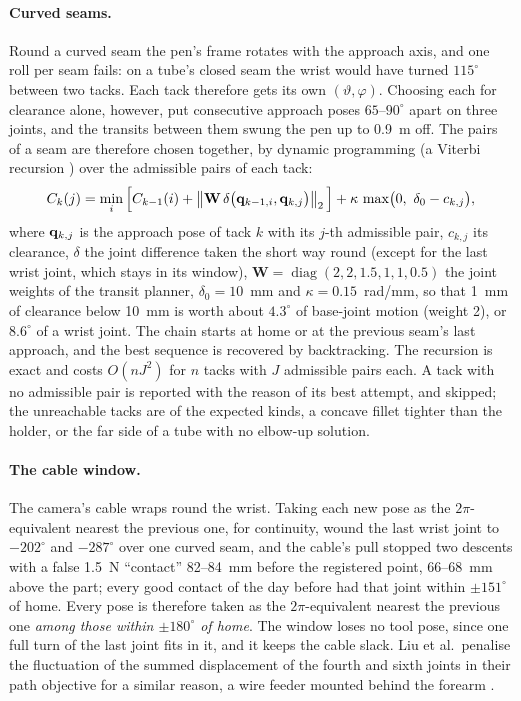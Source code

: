 \paragraph{Curved seams.} Round a curved seam the pen's frame rotates with the approach axis, and one
roll per seam fails: on a tube's closed seam the wrist would have turned $115^\circ$ between two tacks.
Each tack therefore gets its own $(\vartheta,\varphi)$. Choosing each for clearance alone, however, put
consecutive approach poses $65$--$90^\circ$ apart on three joints, and the transits between them swung
the pen up to 0.9~m off. The pairs of a seam are therefore chosen together, by dynamic programming (a
Viterbi recursion \cite{forney1973viterbi}) over the admissible pairs of each tack:
\begin{equation}
C_k(j)=\min_{i}\Big[C_{k-1}(i)+\left\lVert\mathbf{W}\,\delta\big(\mathbf{q}_{k-1,i},\mathbf{q}_{k,j}\big)\right\rVert_2\Big]
+\kappa\,\max\!\big(0,\ \delta_0-c_{k,j}\big),
\label{eq:roll_dp}
\end{equation}
where $\mathbf{q}_{k,j}$ is the approach pose of tack $k$ with its $j$-th admissible pair, $c_{k,j}$ its
clearance, $\delta$ the joint difference taken the short way round (except for the last wrist joint,
which stays in its window), $\mathbf{W}=\operatorname{diag}(2,2,1.5,1,1,0.5)$ the joint weights of the
transit planner, $\delta_0=10$~mm and $\kappa=0.15$~rad/mm, so that 1~mm of clearance below 10~mm is
worth about $4.3^\circ$ of base-joint motion (weight 2), or $8.6^\circ$ of a wrist joint. The chain starts at home or at the previous seam's last
approach, and the best sequence is recovered by backtracking. The recursion is exact and costs
$O(nJ^2)$ for $n$ tacks with $J$ admissible pairs each. A tack with no admissible pair is reported with
the reason of its best attempt, and skipped; the unreachable tacks are of the expected kinds, a concave
fillet tighter than the holder, or the far side of a tube with no elbow-up solution.

\paragraph{The cable window.} The camera's cable wraps round the wrist. Taking each new pose as the
$2\pi$-equivalent nearest the previous one, for continuity, wound the last wrist joint to $-202^\circ$
and $-287^\circ$ over one curved seam, and the cable's pull stopped two descents with a false 1.5~N
``contact'' 82--84~mm before the registered point, 66--68~mm above the part; every good contact of the day before had that joint within
$\pm151^\circ$ of home. Every pose is therefore taken as the $2\pi$-equivalent nearest the previous one
\emph{among those within $\pm180^\circ$ of home}. The window loses no tool pose, since one full turn of
the last joint fits in it, and it keeps the cable slack. Liu et al.\ penalise the fluctuation of the
summed displacement of the fourth and sixth joints in their path objective for a similar reason, a wire
feeder mounted behind the forearm \cite{liu2023rcim}.

